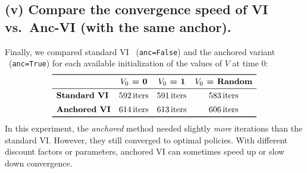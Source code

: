 \subsection*{(v) Compare the convergence speed of VI vs.\ Anc-VI (with the same anchor).}

\noindent
Finally, we compared standard VI \ (\texttt{anc=False}) and the anchored variant 
\ (\texttt{anc=True}) for each available initialization of the values of $V$ at time $0$:
\[
  \begin{array}{lccc}
  \toprule
    & \textbf{$V_0$ = 0} & \textbf{$V_0$ = 1} & \textbf{$V_0$ = Random} \\
  \midrule
  \textbf{Standard VI} & 592\,\text{iters} & 591\,\text{iters} & 583\,\text{iters}\\[5pt]
  \textbf{Anchored VI} & 614\,\text{iters} & 613\,\text{iters} & 606\,\text{iters}\\
  \bottomrule
  \end{array}
\]
In this experiment, the \emph{anchored} method needed slightly \emph{more} iterations 
than the standard VI.  However, they still converged to optimal policies. 
With different discount factors or parameters, anchored VI can sometimes speed up or slow down convergence.
